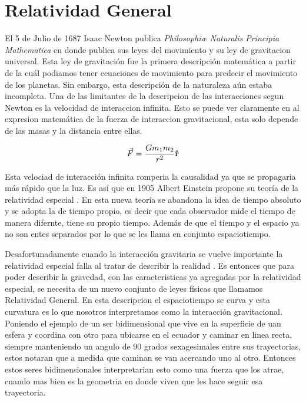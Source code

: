 \documentclass[../Main.tex]{subfiles}
\begin{document}
\section{Relatividad General}
El 5 de Julio de 1687 Isaac Newton publica \textit{Philosophiæ Naturalis Principia Mathematica} \cite{newton87a} en donde publica sus leyes del movimiento y su ley de gravitacion universal. Esta ley de gravitación fue la primera descripción matemática a partir de la cuál podiamos tener ecuaciones de movimiento para predecir el movimiento de los planetas. Sin embargo, esta descripción de la naturaleza aún estaba incompleta. Una de las limitantes de la descripcion de las interacciones segun Newton es la velocidad de interaccion infinita. Esto se puede ver claramente en al expresion matemática de la fuerza de interaccion gravitacional, esta solo depende de las masas y la distancia entre ellas. 

\begin{equation}
    \vec{F} = \frac{Gm_1m_2}{r^2} \vu{r}
\end{equation}

Esta velociad de interacción infinita romperia la causalidad ya que se propagaria más rápido que la luz. Es así que en 1905 Albert Einstein propone su teoría de la relatividad especial \cite{einstein}. En esta nueva teoría se abandona la idea de tiempo absoluto y se adopta la de tiempo propio, es decir que cada observador mide el tiempo de manera difernte, tiene su propio tiempo. Además de que el tiempo y el espacio ya no son entes separados por lo que se les llama en conjunto espaciotiempo.

Desafortunadamente cuando la interacción gravitaria se vuelve importante la relatividad especial falla al tratar de describir la realidad \cite{1994bhtw.bookT}. Es entonces que para poder describir la gravedad, con las caracteristicas ya agregadas por la relatividad especial, se necesita de un nuevo conjunto de leyes físicas que llamamos Relatividad General. En esta descripcion el espaciotiempo se curva y esta curvatura es lo que nosotros interpretamos como la interacción gravitacional. Poniendo el ejemplo de un ser bidimensional que vive en la superficie de uan esfera y coordina con otro para ubicarse en el ecuador y caminar en linea recta, siempre manteniendo un angulo de 90 grados sexagesimales entre sus trayectorias, estos notaran que a medida que caminan se van acercando uno al otro. Entonces estos seres bidimensionales interpretarian esto como una fuerza que los atrae, cuando mas bien es la geometria en donde viven que les hace seguir esa trayectoria.
\end{document}
